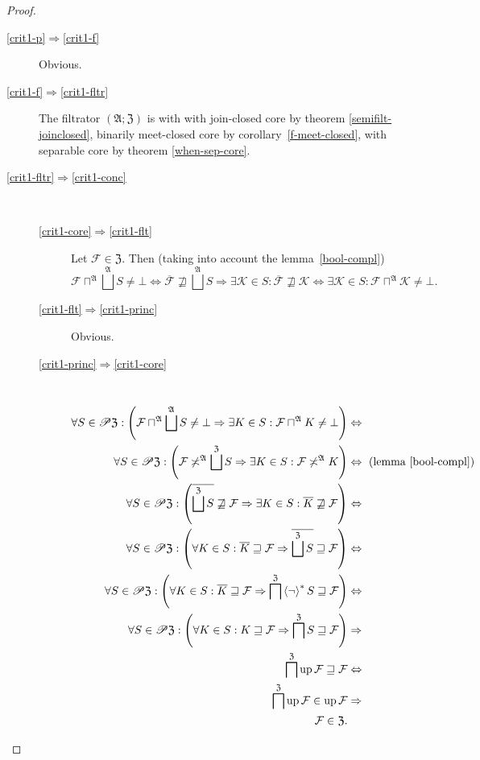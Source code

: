 \begin{proof}
~
\begin{description}
\item [{\ref{crit1-p}$\Rightarrow$\ref{crit1-f}}] Obvious.
\item [{\ref{crit1-f}$\Rightarrow$\ref{crit1-fltr}}] The filtrator $(\mathfrak{A};\mathfrak{Z})$
is with with join-closed core by theorem \ref{semifilt-joinclosed},
binarily meet-closed core by corollary~\ref{f-meet-closed}, with
separable core by theorem \ref{when-sep-core}.
\item [{\ref{crit1-fltr}$\Rightarrow$\ref{crit1-conc}}] ~

\begin{description}
\item [{\ref{crit1-core}$\Rightarrow$\ref{crit1-flt}}] Let $\mathcal{F}\in\mathfrak{Z}$.
Then (taking into account the lemma~\ref{bool-compl})
\[
\mathcal{F}\sqcap^{\mathfrak{A}}\bigsqcup^{\mathfrak{A}}S\ne\bot\Leftrightarrow\overline{\mathcal{F}}\nsqsupseteq\bigsqcup^{\mathfrak{A}}S\Rightarrow\exists\mathcal{K}\in S:\overline{\mathcal{F}}\nsqsupseteq\mathcal{K}\Leftrightarrow\exists\mathcal{K}\in S:\mathcal{F}\sqcap^{\mathfrak{A}}\mathcal{K}\ne\bot.
\]

\item [{\ref{crit1-flt}$\Rightarrow$\ref{crit1-princ}}] Obvious.
\item [{\ref{crit1-princ}$\Rightarrow$\ref{crit1-core}}] ~
\begin{align*}
\forall S\in\mathscr{P}\mathfrak{Z}:\left(\mathcal{F}\sqcap^{\mathfrak{A}}\bigsqcup^{\mathfrak{A}}S\ne\bot\Rightarrow\exists K\in S:\mathcal{F}\sqcap^{\mathfrak{A}}K\ne\bot\right) & \Leftrightarrow\\
\forall S\in\mathscr{P}\mathfrak{Z}:\left(\mathcal{F}\not\asymp^{\mathfrak{A}}\bigsqcup^{\mathfrak{Z}}S\Rightarrow\exists K\in S:\mathcal{F}\not\asymp^{\mathfrak{A}}K\right) & \Leftrightarrow\text{ (lemma \ref{bool-compl})}\\
\forall S\in\mathscr{P}\mathfrak{Z}:\left(\overline{\bigsqcup^{\mathfrak{Z}}S}\not\sqsupseteq\mathcal{F}\Rightarrow\exists K\in S:\overline{K}\not\sqsupseteq\mathcal{F}\right) & \Leftrightarrow\\
\forall S\in\mathscr{P}\mathfrak{Z}:\left(\forall K\in S:\overline{K}\sqsupseteq\mathcal{F}\Rightarrow\overline{\bigsqcup^{\mathfrak{Z}}S}\sqsupseteq\mathcal{F}\right) & \Leftrightarrow\\
\forall S\in\mathscr{P}\mathfrak{Z}:\left(\forall K\in S:\overline{K}\sqsupseteq\mathcal{F}\Rightarrow\bigsqcap^{\mathfrak{Z}}\left\langle \lnot\right\rangle ^{\ast}S\sqsupseteq\mathcal{F}\right) & \Leftrightarrow\\
\forall S\in\mathscr{P}\mathfrak{Z}:\left(\forall K\in S:K\sqsupseteq\mathcal{F}\Rightarrow\bigsqcap^{\mathfrak{Z}}S\sqsupseteq\mathcal{F}\right) & \Rightarrow\\
\bigsqcap^{\mathfrak{Z}}\operatorname{up}\mathcal{F}\sqsupseteq\mathcal{F} & \Leftrightarrow\\
\bigsqcap^{\mathfrak{Z}}\operatorname{up}\mathcal{F}\in\operatorname{up}\mathcal{F} & \Rightarrow\\
\mathcal{F}\in\mathfrak{Z}.
\end{align*}


\end{description}
\end{description}
\end{proof}
